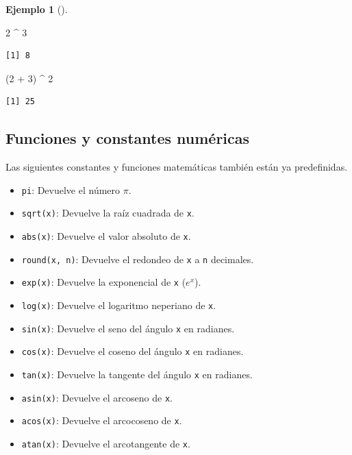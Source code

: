 \documentclass[
  a4paper,
]{scrreport}
\newenvironment{Shaded}{\begin{snugshade}}{\end{snugshade}}
\newcommand{\DecValTok}[1]{\textcolor[rgb]{0.68,0.00,0.00}{#1}}
\newcommand{\NormalTok}[1]{\textcolor[rgb]{0.00,0.23,0.31}{#1}}
\newcommand{\SpecialCharTok}[1]{\textcolor[rgb]{0.37,0.37,0.37}{#1}}
\providecommand{\tightlist}{%
  \setlength{\itemsep}{0pt}\setlength{\parskip}{0pt}}\usepackage{longtable,booktabs,array}
\theoremstyle{definition}
\theoremstyle{definition}
\newtheorem{example}{Ejemplo}[chapter]
\theoremstyle{remark}
\begin{document}
\begin{example}[]
\begin{Shaded}
\begin{Highlighting}[]
\DecValTok{2} \SpecialCharTok{\^{}} \DecValTok{3}
\end{Highlighting}
\end{Shaded}

\begin{verbatim}
[1] 8
\end{verbatim}

\begin{Shaded}
\begin{Highlighting}[]
\NormalTok{(}\DecValTok{2} \SpecialCharTok{+} \DecValTok{3}\NormalTok{) }\SpecialCharTok{\^{}} \DecValTok{2}
\end{Highlighting}
\end{Shaded}

\begin{verbatim}
[1] 25
\end{verbatim}

\end{example}

\hypertarget{funciones-y-constantes-numuxe9ricas}{%
\subsection{Funciones y constantes
numéricas}\label{funciones-y-constantes-numuxe9ricas}}

Las siguientes constantes y funciones matemáticas también están ya
predefinidas.

\begin{itemize}
\tightlist
\item
  \texttt{pi}: Devuelve el número \(\pi\).
\item
  \texttt{sqrt(x)}: Devuelve la raíz cuadrada de \texttt{x}.
\item
  \texttt{abs(x)}: Devuelve el valor absoluto de \texttt{x}.
\item
  \texttt{round(x,\ n)}: Devuelve el redondeo de \texttt{x} a \texttt{n}
  decimales.
\item
  \texttt{exp(x)}: Devuelve la exponencial de \texttt{x} (\(e^x\)).
\item
  \texttt{log(x)}: Devuelve el logaritmo neperiano de \texttt{x}.
\item
  \texttt{sin(x)}: Devuelve el seno del ángulo \texttt{x} en radianes.
\item
  \texttt{cos(x)}: Devuelve el coseno del ángulo \texttt{x} en radianes.
\item
  \texttt{tan(x)}: Devuelve la tangente del ángulo \texttt{x} en
  radianes.
\item
  \texttt{asin(x)}: Devuelve el arcoseno de \texttt{x}.
\item
  \texttt{acos(x)}: Devuelve el arcocoseno de \texttt{x}.
\item
  \texttt{atan(x)}: Devuelve el arcotangente de \texttt{x}.
\end{itemize}
\end{document}

